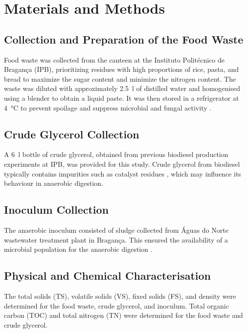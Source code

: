 \chapter{Materials and Methods}
\label{ch:materials_methods}

\section{Collection and Preparation of the Food Waste}
\label{sec:col_prep_FW}

Food waste was collected from the canteen at the Instituto Politécnico de Bragança (IPB), prioritizing residues with high proportions of rice, pasta, and bread to maximize the sugar content and minimize the nitrogen content. The waste was diluted with approximately \qty{2.5}{\litre} of distilled water and homogenised using a blender to obtain a liquid paste. It was then stored in a refrigerator at \qty{4}{\celsius} to prevent spoilage and suppress microbial and fungal activity \parencite{degueurce2020}.

\section{Crude Glycerol Collection}
\label{sec:gly_col}

A \qty{6}{\litre} bottle of crude glycerol, obtained from previous biodiesel production experiments at IPB, was provided for this study. Crude glycerol from biodiesel typically contains impurities such as catalyst residues \parencite{attarbachi2023}, which may influence its behaviour in anaerobic digestion.

\section{Inoculum Collection}
\label{sec:ino_col}

The anaerobic inoculum consisted of sludge collected from Águas do Norte wastewater treatment plant in Bragança. This ensured the availability of a microbial population for the anaerobic digestion \parencite{posmanik2020}.

\section{Physical and Chemical Characterisation}
\label{sec:phy_chem_char}

The total solids (TS), volatile solids (VS), fixed solids (FS), and density were determined for the food waste, crude glycerol, and inoculum. Total organic carbon (TOC) and total nitrogen (TN) were determined for the food waste and crude glycerol.

